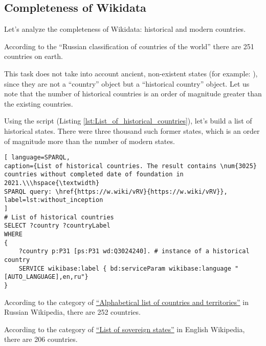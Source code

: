 \subsection{Completeness of Wikidata}

Let's analyze the completeness of Wikidata: historical and modern countries.

According to the ``Russian classification of countries of the world'' there are 251 countries on earth.

This task does not take into account ancient, non-existent states (for example: ), since they are not a ``country'' object but a ``historical country'' object. Let us note that the number of historical countries is an order of magnitude greater than the existing countries.


Using the script (Listing \ref{lst:List_of_historical_countries}), let's build a list of historical states. There were three thousand such former states, which is an order of magnitude more than the number of modern states.

\begin{lstlisting}[ language=SPARQL, 
caption={List of historical countries. The result contains \num{3025} countries without completed date of foundation in 2021.\\\hspace{\textwidth}
SPARQL query: \href{https://w.wiki/vRV}{https://w.wiki/vRV}},
label=lst:without_inception
]
# List of historical countries
SELECT ?country ?countryLabel
WHERE
{
	?country p:P31 [ps:P31 wd:Q3024240]. # instance of a historical country 
	SERVICE wikibase:label { bd:serviceParam wikibase:language "[AUTO_LANGUAGE],en,ru"} 
}
\end{lstlisting}



According to the category of \href{https://w.wiki/dWv}{``Alphabetical list of countries and territories''} in Russian Wikipedia, there are 252 countries.

According to the category of \href{https://en.wikipedia.org/wiki/List_of_sovereign_states}{``List of sovereign states''} in English Wikipedia, there are 206 countries.

